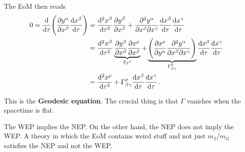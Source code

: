 \documentclass[main.tex]{subfiles}
\begin{document}
The EoM then reads 
%
\begin{subequations}
\begin{align}
0 = \dv{}{\tau } \qty(\pdv{y^{\alpha }}{x^{\beta }} \dv{x^{\beta }}{\tau }) 
&=  \dv[2]{x^{\beta }}{\tau } \pdv{y^{\beta }}{x^{\beta }} 
+ \pdv[2]{y^{\alpha }}{x^{\beta }}{x^{\gamma }} \dv{x^{\beta }}{\tau } \dv{x^{\gamma }}{\tau }  \\
&= \dv[2]{x^{\beta }}{\tau } \underbrace{\pdv{y^{\beta }}{x^{\beta }}
\pdv{x^{\rho }}{x^{\beta }}}_{ \delta_{\beta }{}^{\rho }} 
+ \underbrace{\qty( \pdv{x^{\rho }}{y^{\alpha }} \pdv[2]{y^{\alpha }}{x^{\beta }}{x^{\gamma }} )}_{ \Gamma^{\rho }_{\beta \gamma }}
\dv{x^{\beta }}{\tau }  \dv{x^{\gamma }}{\tau }  \\
&= \dv[2]{x^{\rho }}{\tau } + \Gamma^{\rho }_{\beta \gamma } \dv{x^{\beta }}{\tau }  \dv{x^{\gamma }}{\tau }
\,.
\end{align}
\end{subequations}

This is the \textbf{Geodesic equation}.
The crucial thing is that \(\Gamma \) vanishes when the spacetime is flat. 

The WEP implies the NEP. 
On the other hand, the NEP does not imply the WEP. 
A theory in which the EoM contains weird stuff and not just \(m_I / m_G\) satisfies the NEP and not the WEP. 

\end{document}
